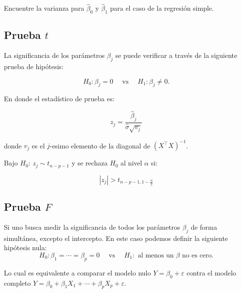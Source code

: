 \documentclass[
  12pt,
]{book}
\begin{document}
\leavevmode{}%
Encuentre la varianza para \(\hat \beta_{0}\) y \(\hat \beta_{1}\) para
el caso de la regresión simple.

\hypertarget{prueba-t}{%
\subsection{\texorpdfstring{Prueba \(t\)}{Prueba t}}\label{prueba-t}}

La significancia de los parámetros \(\beta_j\) se puede verificar a
través de la siguiente prueba de hipótesis:

\begin{equation*}
 H_{0}: \beta_{j} = 0 \quad \text{ vs } \quad H_{1}:\beta_{j}\neq 0.
 \end{equation*}

En donde el estadístico de prueba es:

\begin{equation*}
 z_{j} = \frac{\hat{\beta}_{j}}{\hat{\sigma} \sqrt{v_{j}}} 
 \end{equation*}

donde \(v_{j}\) es el \(j\)-esimo elemento de la diagonal de
\((X^{\top}X)^{-1}\).

Bajo \(H_{0}\): \(z_{j} \sim t_{n-p-1}\) y se rechaza \(H_{0}\) al nivel
\(\alpha\) si:

\begin{equation*}
 \left\vert z_{j} \right\vert > t_{n-p-1, 1-\frac{\alpha}{2}} 
 \end{equation*}

\hypertarget{prueba-f}{%
\subsection{\texorpdfstring{Prueba \(F\)}{Prueba F}}\label{prueba-f}}

Si uno busca medir la significancia de todos los parámetros \(\beta_j\)
de forma simultánea, excepto el intercepto. En este caso podemos definir
la siguiente hipótesis nula: \begin{equation*}
 H_{0}: \beta_{1} = \cdots =\beta_{p} = 0 \quad 
 \text{  vs   }\quad H_{1}: \text{ al menos un \(\beta\) no es cero}.
 \end{equation*}

Lo cual es equivalente a comparar el modelo nulo
\(Y=\beta_{0}+\varepsilon\) contra el modelo completo
\(Y=\beta_{0}+ \beta_{1}X_{1} + \cdots + \beta_{p}X_{p} + \varepsilon\).
\end{document}
